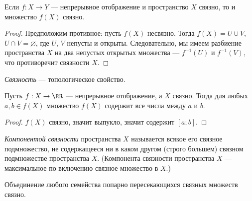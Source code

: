 \documentclass[12pt,a4paper]{article}
\begin{document}
    \begin{theorem}
        Если $f: X \to Y$ --- непрерывное отображение и пространство $X$ связно, то и множество $f(X)$ связно.
    \end{theorem}

    \begin{proof}
        Предположим противное: пусть $f(X)$ несвязно. Тогда $f(X) = U \cup V$, $U \cap V = \varnothing$, где $U$, $V$ непусты и открыты. Следовательно, мы имеем разбиение пространства $X$ на два непустых открытых множества --- $f^{-1}(U)$ и $f^{-1}(V)$, что противоречит связности $X$.
    \end{proof}

    \begin{corollary}
        \emph{Связность} --- топологическое свойство.
    \end{corollary}

    \begin{theorem}
        Пусть $f: X \to \RR$ --- непрерывное отображение, а $X$ связно. Тогда для любых $a, b \in f(X)$ множество $f(X)$ содержит все числа между $a$ и $b$.
    \end{theorem}

    \begin{proof}
        $f(X)$ связно, значит выпукло, значит содержит $[a; b]$.
    \end{proof}

    \begin{definition}
        \emph{Компонентой связности} пространства $X$ называется всякое его связное подмножество, не содержащееся ни в каком другом (строго большем) связном подмножестве пространства $X$. (Компонента связности пространства $X$ --- максимальное по включению связное множество в $X$.)
    \end{definition}

    \begin{lemma}
        Объединение любого семейства попарно пересекающихся связных множеств связно.
    \end{lemma}
\end{document}
